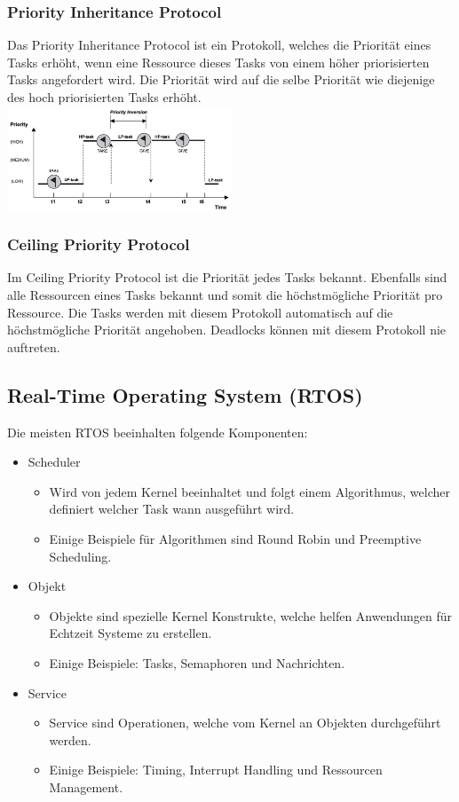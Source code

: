 \subsubsection{Priority Inheritance Protocol}
Das Priority Inheritance Protocol ist ein Protokoll, welches die Priorität eines Tasks erhöht, wenn eine Ressource dieses Tasks von einem höher priorisierten Tasks angefordert wird. Die Priorität wird auf die selbe Priorität wie diejenige des hoch priorisierten Tasks erhöht. \\
\includegraphics[width=0.5\textwidth]{images/Betriebssysteme/priority_inheritance.png}

\subsubsection{Ceiling Priority Protocol}
Im Ceiling Priority Protocol ist die Priorität jedes Tasks bekannt. Ebenfalls sind alle Ressourcen eines Tasks bekannt und somit die höchstmögliche Priorität pro Ressource. Die Tasks werden mit diesem Protokoll automatisch auf die höchstmögliche Priorität angehoben. Deadlocks können mit diesem Protokoll nie auftreten.

\subsection{Real-Time Operating System (RTOS)}
Die meisten RTOS beeinhalten folgende Komponenten:
\begin{itemize}
    \item Scheduler
    \begin{itemize}
        \item Wird von jedem Kernel beeinhaltet und folgt einem Algorithmus, welcher definiert welcher Task wann ausgeführt wird.
        \item Einige Beispiele für Algorithmen sind Round Robin und Preemptive Scheduling.
    \end{itemize}
    \item Objekt
    \begin{itemize}
        \item Objekte sind spezielle Kernel Konstrukte, welche helfen Anwendungen für Echtzeit Systeme zu erstellen.
        \item Einige Beispiele: Tasks, Semaphoren und Nachrichten.
    \end{itemize}
    \item Service
    \begin{itemize}
        \item Service sind Operationen, welche vom Kernel an Objekten durchgeführt werden.
        \item Einige Beispiele: Timing, Interrupt Handling und Ressourcen Management.
    \end{itemize}
\end{itemize}

